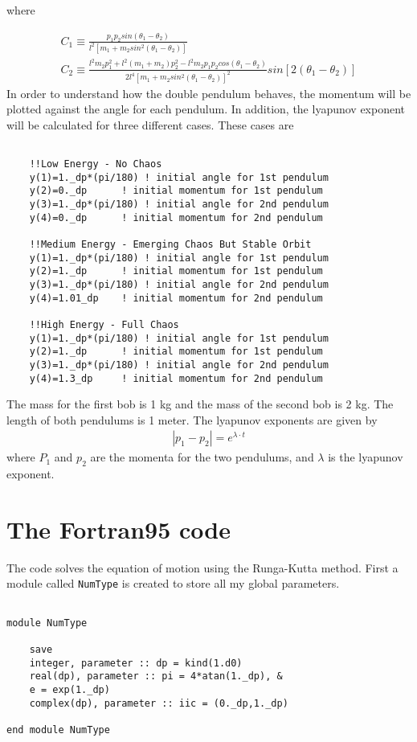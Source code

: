 \documentclass[12pt]{article}
\begin{document}
where

\begin{gather}
C_1 \equiv \frac{p_1p_2sin(\theta_1-\theta_2)}{l^2[m_1+m_2sin^2(\theta_1-\theta_2)]} \\
C_2 \equiv \frac{l^2m_2p_1^2+l^2(m_1+m_2)p_2^2-l^2m_2p_1p_2cos(\theta_1-\theta_2)}{2l^4[m_1+m_2sin^2(\theta_1-\theta_2)]^2}sin[2(\theta_1-\theta_2)]
\end{gather}
In order to understand how the double pendulum behaves, the momentum will be plotted against the angle for each pendulum. In addition, the lyapunov exponent will be calculated for three different cases. These cases are 

\begin{lstlisting}[frame=single,caption={Module {\tt Cases}},label=module]

	!!Low Energy - No Chaos
	y(1)=1._dp*(pi/180)	! initial angle for 1st pendulum
	y(2)=0._dp		! initial momentum for 1st pendulum
	y(3)=1._dp*(pi/180)	! initial angle for 2nd pendulum
	y(4)=0._dp		! initial momentum for 2nd pendulum

	!!Medium Energy - Emerging Chaos But Stable Orbit
 	y(1)=1._dp*(pi/180)	! initial angle for 1st pendulum
 	y(2)=1._dp		! initial momentum for 1st pendulum
  	y(3)=1._dp*(pi/180)	! initial angle for 2nd pendulum
  	y(4)=1.01_dp	! initial momentum for 2nd pendulum

	!!High Energy - Full Chaos
 	y(1)=1._dp*(pi/180)	! initial angle for 1st pendulum
 	y(2)=1._dp		! initial momentum for 1st pendulum
 	y(3)=1._dp*(pi/180) ! initial angle for 2nd pendulum
 	y(4)=1.3_dp		! initial momentum for 2nd pendulum

\end{lstlisting}
The mass for the first bob is 1 kg and the mass of the second bob is 2 kg. The length of both pendulums is 1 meter. The lyapunov exponents are given by
\begin{gather}
|p_1-p_2|=e^{\lambda \cdot t}
\end{gather}
where $P_1$ and $p_2$ are the momenta for the two pendulums, and $\lambda$ is the lyapunov exponent.

\section{The Fortran95 code}

The code solves the equation of motion using the Runga-Kutta method. First a module called {\tt NumType} is created to store all my global parameters.
\begin{lstlisting}[frame=single,caption={Module {\tt NumType}},label=module]

module NumType

	save
	integer, parameter :: dp = kind(1.d0)
	real(dp), parameter :: pi = 4*atan(1._dp), &
	e = exp(1._dp)
	complex(dp), parameter :: iic = (0._dp,1._dp)
	
end module NumType

\end{lstlisting}
\end{document}
